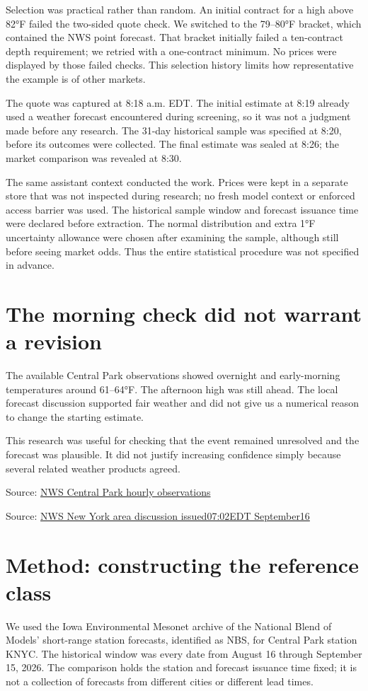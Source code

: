 \documentclass[11pt]{article}
\begin{document}
Selection was practical rather than random. An initial contract for a high above 82°F failed the two-sided quote check. We switched to the 79–80°F bracket, which contained the NWS point forecast. That bracket initially failed a ten-contract depth requirement; we retried with a one-contract minimum. No prices were displayed by those failed checks. This selection history limits how representative the example is of other markets.


The quote was captured at 8:18 a.m. EDT. The initial estimate at 8:19 already used a weather forecast encountered during screening, so it was not a judgment made before any research. The 31-day historical sample was specified at 8:20, before its outcomes were collected. The final estimate was sealed at 8:26; the market comparison was revealed at 8:30.


The same assistant context conducted the work. Prices were kept in a separate store that was not inspected during research; no fresh model context or enforced access barrier was used. The historical sample window and forecast issuance time were declared before extraction. The normal distribution and extra 1°F uncertainty allowance were chosen after examining the sample, although still before seeing market odds. Thus the entire statistical procedure was not specified in advance.


\section*{\textcolor{epdarkgreen}{The morning check did not warrant a revision}}
The available Central Park observations showed overnight and early-morning temperatures around 61–64°F. The afternoon high was still ahead. The local forecast discussion supported fair weather and did not give us a numerical reason to change the starting estimate.


This research was useful for checking that the event remained unresolved and the forecast was plausible. It did not justify increasing confidence simply because several related weather products agreed.


\par{\small Source: \href{https://forecast.weather.gov/data/obhistory/KNYC.html}{NWS Central Park hourly observations}}
\par{\small Source: \href{https://forecast.weather.gov/product.php?site=OKX\&issuedby=OKX\&product=AFD\&format=CI\&version=1\&glossary=1}{NWS New York area discussion issued07:02EDT September16}}
\section*{\textcolor{epdarkgreen}{Method: constructing the reference class}}
We used the Iowa Environmental Mesonet archive of the National Blend of Models’ short-range station forecasts, identified as NBS, for Central Park station KNYC. The historical window was every date from August 16 through September 15, 2026. The comparison holds the station and forecast issuance time fixed; it is not a collection of forecasts from different cities or different lead times.
\end{document}
